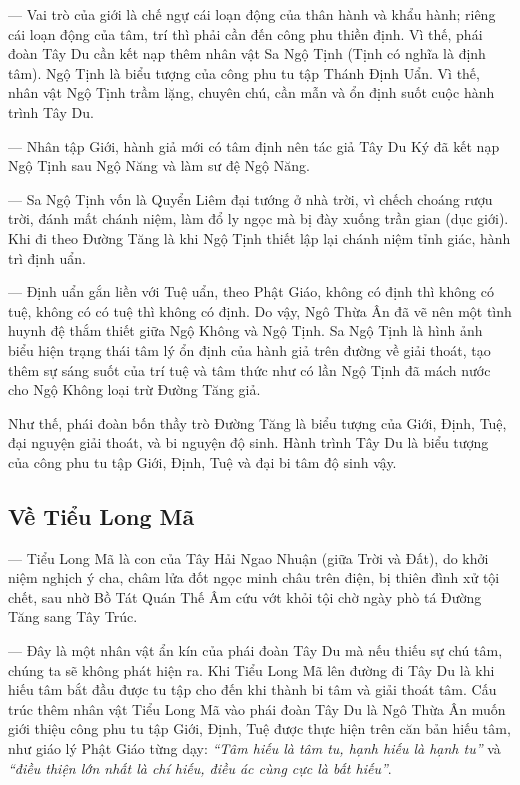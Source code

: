 --- Vai trò của giới là chế ngự cái loạn động của thân hành và khẩu hành; riêng cái loạn động của tâm, trí thì phải cần đến công phu thiền định. Vì thế, phái đoàn Tây Du cần kết nạp thêm nhân vật Sa Ngộ Tịnh (Tịnh có nghĩa là định tâm). Ngộ Tịnh là biểu tượng của công phu tu tập Thánh Định Uẩn. Vì thế, nhân vật Ngộ Tịnh trầm lặng, chuyên chú, cần mẫn và ổn định suốt cuộc hành trình Tây Du.

--- Nhân tập Giới, hành giả mới có tâm định nên tác giả Tây Du Ký đã kết nạp Ngộ Tịnh sau Ngộ Năng và làm sư đệ Ngộ Năng.

--- Sa Ngộ Tịnh vốn là Quyển Liêm đại tướng ở nhà trời, vì chếch choáng rượu trời, đánh mất chánh niệm, làm đổ ly ngọc mà bị đày xuống trần gian (dục giới). Khi đi theo Đường Tăng là khi Ngộ Tịnh thiết lập lại chánh niệm tỉnh giác, hành trì định uẩn.

--- Định uẩn gắn liền với Tuệ uẩn, theo Phật Giáo, không có định thì không có tuệ, không có có tuệ thì không có định. Do vậy, Ngô Thừa Ân đã vẽ nên một tình huynh đệ thắm thiết giữa Ngộ Không và Ngộ Tịnh. Sa Ngộ Tịnh là hình ảnh biểu hiện trạng thái tâm lý ổn định của hành giả trên đường về giải thoát, tạo thêm sự sáng suốt của trí tuệ và tâm thức như có lần Ngộ Tịnh đã mách nước cho Ngộ Không loại trừ Đường Tăng giả.

Như thế, phái đoàn bốn thầy trò Đường Tăng là biểu tượng của Giới, Định, Tuệ, đại nguyện giải thoát, và bi nguyện độ sinh. Hành trình Tây Du là biểu tượng của công phu tu tập Giới, Định, Tuệ và đại bi tâm độ sinh vậy.

\subsection{Về Tiểu Long Mã} %
\label{sub:ve_tieu_long_ma}

--- Tiểu Long Mã là con của Tây Hải Ngao Nhuận (giữa Trời và Đất), do khởi niệm nghịch ý cha, châm lửa đốt ngọc minh châu trên điện, bị thiên đình xử tội chết, sau nhờ Bồ Tát Quán Thế Âm cứu vớt khỏi tội chờ ngày phò tá Đường Tăng sang Tây Trúc.

--- Đây là một nhân vật ẩn kín của phái đoàn Tây Du mà nếu thiếu sự chú tâm, chúng ta sẽ không phát hiện ra. Khi Tiểu Long Mã lên đường đi Tây Du là khi hiếu tâm bắt đầu được tu tập cho đến khi thành bi tâm và giải thoát tâm. Cấu trúc thêm nhân vật Tiểu Long Mã vào phái đoàn Tây Du là Ngô Thừa Ân muốn giới thiệu công phu tu tập Giới, Định, Tuệ được thực hiện trên căn bản hiếu tâm, như giáo lý Phật Giáo từng dạy: \emph{``Tâm hiếu là tâm tu, hạnh hiếu là hạnh tu''} và \emph{``điều thiện lớn nhất là chí hiếu, điều ác cùng cực là bất hiếu''}.


